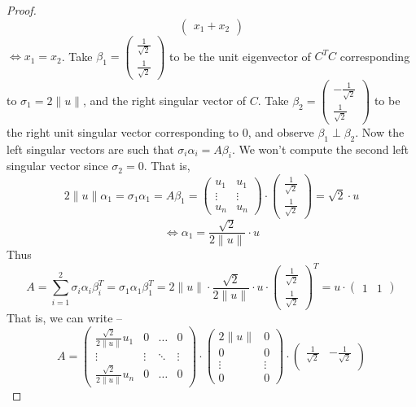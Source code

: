 \documentclass[11pt]{article}
\theoremstyle{quest}
\begin{document}
\begin{proof}
$$\begin{pmatrix}
x_1 + x_2
\end{pmatrix}$$
$\iff x_1 = x_2$. Take $\beta_1 = \begin{pmatrix}
\frac{1}{\sqrt{2}} \\
\frac{1}{\sqrt{2}}
\end{pmatrix}$ to be the unit eigenvector of $C^TC$ corresponding to $\sigma_1 = 2\|u\|$, and the right singular vector of $C$. Take $\beta_2 = \begin{pmatrix}
-\frac{1}{\sqrt{2}} \\
\frac{1}{\sqrt{2}}
\end{pmatrix}$ to be the right unit singular vector corresponding to $0$, and observe $\beta_1 \perp \beta_2$.
Now the left singular vectors are such that $\sigma_i \alpha_i = A \beta_i$. We won't compute the second left singular vector since $\sigma_2 = 0$. That is,
$$2 \|u\| \alpha_1 = \sigma_1 \alpha_1 = A \beta_1 = \begin{pmatrix}
u_1 & u_1 \\
\vdots & \vdots \\
u_n & u_n
\end{pmatrix} \cdot \begin{pmatrix}
\frac{1}{\sqrt{2}} \\
\frac{1}{\sqrt{2}}
\end{pmatrix} = \sqrt{2} \cdot u$$
$$\iff \alpha_1 = \dfrac{\sqrt{2}}{2\|u\|} \cdot u$$
Thus
$$A = \sum_{i=1}^2 \sigma_i \alpha_i \beta_i^T = \sigma_1 \alpha_1 \beta_1^T = 2\|u\| \cdot \dfrac{\sqrt{2}}{2 \|u\|} \cdot u \cdot \begin{pmatrix}
\frac{1}{\sqrt{2}} \\
\frac{1}{\sqrt{2}}
\end{pmatrix}^T = u \cdot \begin{pmatrix}
1 & 1
\end{pmatrix} $$
That is, we can write --
$$A = \begin{pmatrix}
\frac{\sqrt{2}}{2 \|u\|} u_1 & 0 & \ldots & 0 \\
\vdots & \vdots & \ddots & \vdots \\
\frac{\sqrt{2}}{2 \|u\|} u_n & 0 & \ldots & 0
\end{pmatrix} \cdot \begin{pmatrix}
2\|u\| & 0 \\
0 & 0 \\
\vdots & \vdots \\
0 & 0
\end{pmatrix} \cdot \begin{pmatrix}
\frac{1}{\sqrt{2}} & -\frac{1}{\sqrt{2}} \\

\end{pmatrix}$$
\end{proof}
\end{document}
